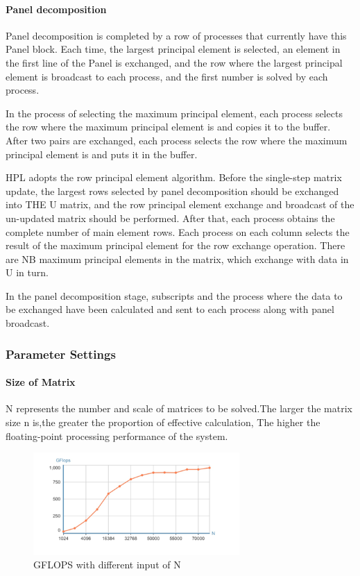 \documentclass[a4paper,12pt]{article}
\begin{document}
\paragraph{Panel decomposition}

Panel decomposition is completed by a row of processes that currently have this Panel block. Each time, the largest principal element is selected, an element in the first line of the Panel is exchanged, and the row where the largest principal element is broadcast to each process, and the first number is solved by each process.

In the process of selecting the maximum principal element, each process selects the row where the maximum principal element is and copies it to the buffer. After two pairs are exchanged, each process selects the row where the maximum principal element is and puts it in the buffer.

HPL adopts the row principal element algorithm. Before the single-step matrix update, the largest rows selected by panel decomposition should be exchanged into THE U matrix, and the row principal element exchange and broadcast of the un-updated matrix should be performed. After that, each process obtains the complete number of main element rows. Each process on each column selects the result of the maximum principal element for the row exchange operation. There are NB maximum principal elements in the matrix, which exchange with data in U in turn.

In the panel decomposition stage, subscripts and the process where the data to be exchanged have been calculated and sent to each process along with panel broadcast.

\subsubsection{Parameter Settings}

\paragraph{Size of Matrix}

N represents the number and scale of matrices to be solved.The larger the matrix size n is,the greater the proportion of effective calculation, The higher the floating-point processing performance of the system.

\begin{figure}[H]
    \centering
    \includegraphics[width=0.7\textwidth]{images/performance/GFLOPS_N.png}
    \caption{GFLOPS with different input of N}
    \label{fig:gflops_n}
\end{figure}
\end{document}
